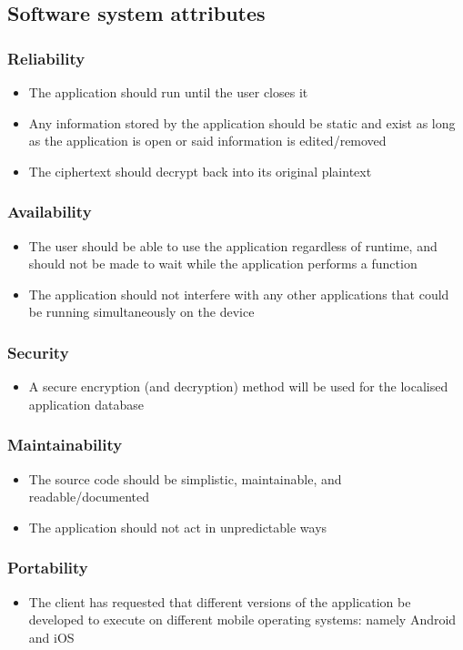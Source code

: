 \subsection{Software system attributes}
\subsubsection{Reliability}
\begin{itemize}
\item The application should run until the user closes it
\item Any information stored by the application should be static and exist as long as the application is open or said information is edited/removed
\item The ciphertext should decrypt back into its original plaintext
\end{itemize}
\subsubsection{Availability}
\begin{itemize}
\item The user should be able to use the application regardless of runtime, and should not be made to wait while the application performs a function
\item The application should not interfere with any other applications that could be running simultaneously on the device
\end{itemize}
\subsubsection{Security}
\begin{itemize}
\item A secure encryption (and decryption) method will be used for the localised application database
\end{itemize}
\subsubsection{Maintainability}
\begin{itemize}
\item The source code should be simplistic, maintainable, and readable/documented
\item The application should not act in unpredictable ways
\end{itemize}
\subsubsection{Portability}
\begin{itemize}
\item The client has requested that different versions of the application be developed to execute on different mobile operating systems: namely Android and iOS
\end{itemize}
